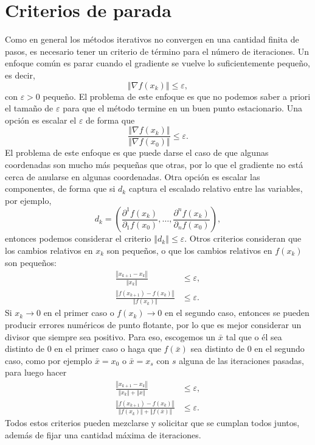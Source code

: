 \section{Criterios de parada}

Como en general los métodos iterativos no convergen en una cantidad finita de pasos, es necesario tener un criterio de término para el número de iteraciones. Un enfoque común es parar cuando el gradiente se vuelve lo suficientemente pequeño, es decir,
\begin{equation*}
\left\Vert \nabla f(x_k) \right\Vert \leq \varepsilon,
\end{equation*}
con \(\varepsilon > 0\) pequeño. El problema de este enfoque es que no podemos saber a priori el tamaño de \(\varepsilon\) para que el método termine en un buen punto estacionario. Una opción es escalar el \(\varepsilon\) de forma que
\begin{equation*}
\frac{\left\Vert \nabla f(x_k) \right\Vert}{\left\Vert \nabla f(x_0) \right\Vert} \leq \varepsilon.
\end{equation*}
El problema de este enfoque es que puede darse el caso de que algunas coordenadas son mucho más pequeñas que otras, por lo que el gradiente no está cerca de anularse en algunas coordenadas. Otra opción es escalar las componentes, de forma que si \(d_k\) captura el escalado relativo entre las variables, por ejemplo,
\[d_k = \left( \frac{\partial^1 f(x_k)}{\partial_1 f(x_0)}, \dotsc, \frac{\partial^n f(x_k)}{\partial_n f(x_0)}\right),\]
entonces podemos considerar el criterio \(\left\Vert d_k \right\Vert \leq \varepsilon\). Otros criterios consideran que los cambios relativos en \(x_k\) son pequeños, o que los cambios relativos en \(f(x_k)\) son pequeños:
\begin{align*}
\frac{\left\Vert x_{k+1} - x_k \right\Vert}{\left\Vert x_k \right\Vert}			&\leq \varepsilon,\\
\frac{\left\Vert f(x_{k+1}) - f(x_k)\right\Vert}{\left\Vert f(x_k)\right\Vert}	&\leq \varepsilon.
\end{align*}
Si \(x_k \to 0\) en el primer caso o \(f(x_k) \to 0\) en el segundo caso, entonces se pueden producir errores numéricos de punto flotante, por lo que es mejor considerar un divisor que siempre sea positivo. Para eso, escogemos un \(\bar{x}\) tal que o él sea distinto de \(0\) en el primer caso o haga que \(f(\bar{x})\) sea distinto de \(0\) en el segundo caso, como por ejemplo \(\bar{x} = x_0\) o \(\bar{x} = x_s\) con \(s\) alguna de las iteraciones pasadas, para luego hacer
\begin{align*}
\frac{\left\Vert x_{k+1} - x_k \right\Vert}{\left\Vert x_k \right\Vert + \left\Vert \bar{x}\right\Vert}				&\leq \varepsilon,\\
\frac{\left\Vert f(x_{k+1}) - f(x_k) \right\Vert}{\left\Vert f(x_k) \right\Vert + \left\Vert f(\bar{x})\right\Vert}	&\leq \varepsilon.
\end{align*}
Todos estos criterios pueden mezclarse y solicitar que se cumplan todos juntos, además de fijar una cantidad máxima de iteraciones.

